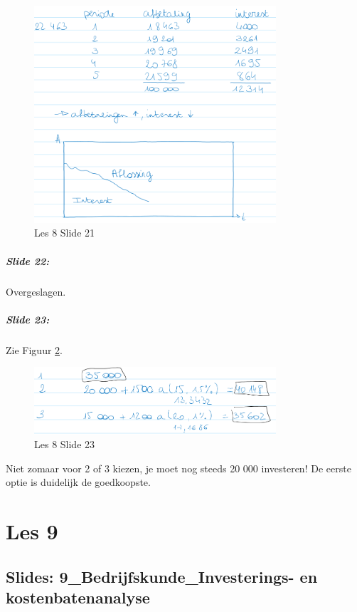 \documentclass[10pt,a4paper]{report}
\begin{document}
\begin{figure}[h!]
\centering
\includegraphics[width=90mm]{Les08_05.png}
\caption{Les 8 Slide 21} 
\label{les08_05}
\end{figure}

\paragraph{Slide 22:} Overgeslagen.

\paragraph{Slide 23:} Zie Figuur \ref{les08_06}.

\begin{figure}[h!]
\centering
\includegraphics[width=90mm]{Les08_06.png}
\caption{Les 8 Slide 23} 
\label{les08_06}
\end{figure}

Niet zomaar voor 2 of 3 kiezen, je moet nog steeds 20 000 investeren! De eerste optie is duidelijk de goedkoopste.

\chapter{Les 9}

\section{Slides: 9\_Bedrijfskunde\_Investerings- en kostenbatenanalyse}
\end{document}
